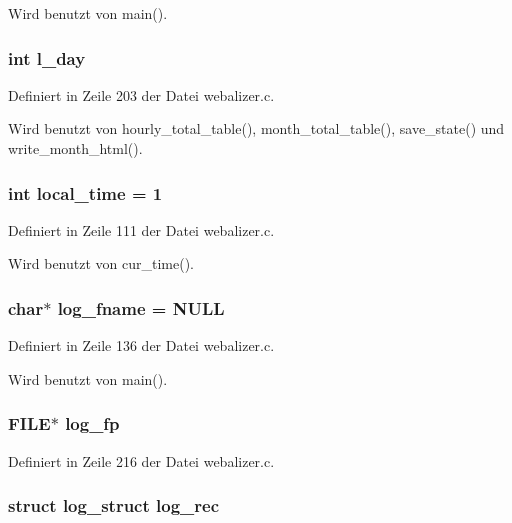 Wird benutzt von main().
\subsubsection{\setlength{\rightskip}{0pt plus 5cm}int {\bf l\_\-day}}\label{webalizer_8c_3322d751ac470f626bc34fb8b34c1759}




Definiert in Zeile 203 der Datei webalizer.c.

Wird benutzt von hourly\_\-total\_\-table(), month\_\-total\_\-table(), save\_\-state() und write\_\-month\_\-html().
\subsubsection{\setlength{\rightskip}{0pt plus 5cm}int {\bf local\_\-time} = 1}\label{webalizer_8c_34c0559db82e0af71c64d53206f763c8}




Definiert in Zeile 111 der Datei webalizer.c.

Wird benutzt von cur\_\-time().
\subsubsection{\setlength{\rightskip}{0pt plus 5cm}char$\ast$ {\bf log\_\-fname} = NULL}\label{webalizer_8c_9db6dddd9890ca88ccca763b0533919b}




Definiert in Zeile 136 der Datei webalizer.c.

Wird benutzt von main().
\subsubsection{\setlength{\rightskip}{0pt plus 5cm}FILE$\ast$ {\bf log\_\-fp}}\label{webalizer_8c_a574e45a6e318dd8f45530c13db10cc1}




Definiert in Zeile 216 der Datei webalizer.c.
\subsubsection{\setlength{\rightskip}{0pt plus 5cm}struct {\bf log\_\-struct} {\bf log\_\-rec}}\label{webalizer_8c_b78a7a0970e517ad18adea541d2b2b32}




